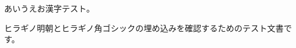 \documentclass{ujarticle}
\begin{document}
あいうえお漢字テスト。

ヒラギノ明朝とヒラギノ角ゴシックの埋め込みを確認するためのテスト文書です。
\end{document}
